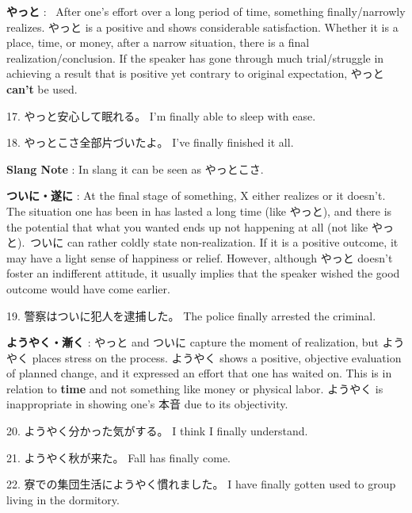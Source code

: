 \par{\textbf{やっと }:  After one's effort over a long period of time, something finally\slash narrowly realizes. やっと is a positive and shows considerable satisfaction. Whether it is a place, time, or money, after a narrow situation, there is a final realization\slash conclusion. If the speaker has gone through much trial\slash struggle in achieving a result that is positive yet contrary to original expectation, やっと \textbf{can't }be used. }

\par{17. やっと安心して眠れる。 \hfill\break
I'm finally able to sleep with ease. }

\par{18. やっとこさ全部片づいたよ。 \hfill\break
I've finally finished it all. }

\par{\textbf{Slang Note }: In slang it can be seen as やっとこさ. }

\par{\textbf{ついに・遂に }: At the final stage of something, X either realizes or it doesn't. The situation one has been in has lasted a long time (like やっと), and there is the potential that what you wanted ends up not happening at all (not like やっと). ついに can rather coldly state non-realization. If it is a positive outcome, it may have a light sense of happiness or relief. However, although やっと doesn't foster an indifferent attitude, it usually implies that the speaker wished the good outcome would have come earlier. }

\par{19. 警察はついに犯人を逮捕した。 \hfill\break
The police finally arrested the criminal. }

\par{\textbf{ようやく・漸く }: やっと and ついに capture the moment of realization, but ようやく places stress on the process. ようやく shows a positive, objective evaluation of planned change, and it expressed an effort that one has waited on. This is in relation to \textbf{time }and not something like money or physical labor. ようやく is inappropriate in showing one's 本音 due to its objectivity. }

\par{20. ようやく分かった気がする。 \hfill\break
I think I finally understand. }

\par{21. ようやく秋が来た。 \hfill\break
Fall has finally come. }

\par{22. 寮での集団生活にようやく慣れました。 \hfill\break
I have finally gotten used to group living in the dormitory. }

